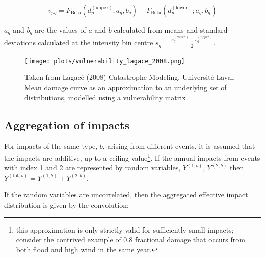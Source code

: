 \documentclass[a4paper,11pt]{extarticle} %
\begin{document}
\begin{equation}
    \label{Eq:BetaVuln}
    v_{pq} = F_{\text{Beta}}(d_p^{(\text{upper})}; a_q, b_q) - F_{\text{Beta}}(d_p^{(\text{lower})}; a_q, b_q)
\end{equation}

$a_q$ and $b_q$ are the values of $a$ and $b$ calculated from means and standard deviations calculated at the intensity bin centre $s_q = \frac{s_q^{(lower)} + s_q^{(upper)}}{2}$.

\begin{figure}[ht]

    \begin{framed}

        \texttt{[image: plots/vulnerability\_lagace\_2008.png]}

    \end{framed}

    \footnotesize

    \renewcommand{\arraystretch}{1.01}

    \vspace{-3ex}


    \vspace{-0.5ex}

    \caption{\small Taken from Lagacé (2008) Catastrophe Modeling, Université Laval. Mean damage curve as an approximation to an underlying set of distributions, modelled using a vulnerability matrix.}
    \label{Fig:vulnerability_matrix}

\end{figure}


\subsection{Aggregation of impacts}
For impacts of the same type, $b$, arising from different events, it is assumed that the impacts are additive, up to a ceiling value\footnote{this approximation is only strictly valid for sufficiently small impacts; consider the contrived example of 0.8 fractional damage that occurs from both flood and high wind in the same year.}. If the annual impacts from events with index 1 and 2 are represented by random variables, $Y^{(1,b)}$, $Y^{(2,b)}$ then $Y^{(\text{tot}, b)} = Y^{(1,b)} + Y^{(2,b)}$.

If the random variables are uncorrelated, then the aggregated effective impact distribution is given by the convolution:
\end{document}
